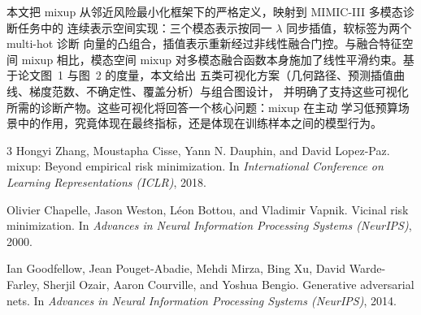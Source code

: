 \documentclass[11pt,a4paper]{article}
\theoremstyle{definition}
\begin{document}
本文把 mixup 从邻近风险最小化框架下的严格定义，映射到 MIMIC-III 多模态诊断任务中的
连续表示空间实现：三个模态表示按同一 $\lambda$ 同步插值，软标签为两个 multi-hot 诊断
向量的凸组合，插值表示重新经过非线性融合门控。与融合特征空间 mixup 相比，模态空间
mixup 对多模态融合函数本身施加了线性平滑约束。基于论文图~1 与图~2 的度量，本文给出
五类可视化方案（几何路径、预测插值曲线、梯度范数、不确定性、覆盖分析）与组合图设计，
并明确了支持这些可视化所需的诊断产物。这些可视化将回答一个核心问题：mixup 在主动
学习低预算场景中的作用，究竟体现在最终指标，还是体现在训练样本之间的模型行为。

\begin{thebibliography}{3}
  Hongyi Zhang, Moustapha Cisse, Yann N. Dauphin, and David Lopez-Paz.
  \newblock mixup: Beyond empirical risk minimization.
  \newblock In \emph{International Conference on Learning Representations (ICLR)}, 2018.

  Olivier Chapelle, Jason Weston, L{\'e}on Bottou, and Vladimir Vapnik.
  \newblock Vicinal risk minimization.
  \newblock In \emph{Advances in Neural Information Processing Systems (NeurIPS)}, 2000.

  Ian Goodfellow, Jean Pouget-Abadie, Mehdi Mirza, Bing Xu, David Warde-Farley,
  Sherjil Ozair, Aaron Courville, and Yoshua Bengio.
  \newblock Generative adversarial nets.
  \newblock In \emph{Advances in Neural Information Processing Systems (NeurIPS)}, 2014.
\end{thebibliography}
\end{document}
